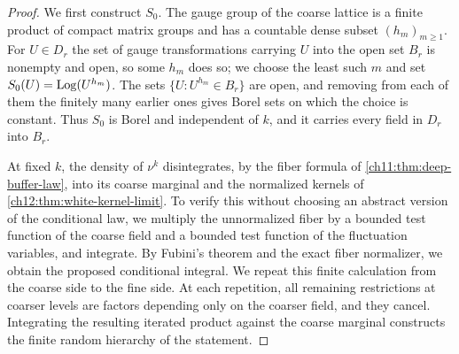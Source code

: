 \begin{proof}
We first construct $S_0$. The gauge group of the coarse lattice is a finite product of compact matrix groups and has a countable dense subset $(h_m)_{m\ge1}$. For $U\in D_r$ the set of gauge transformations carrying $U$ into the open set $B_r$ is nonempty and open, so some $h_m$ does so; we choose the least such $m$ and set $S_0(U)=\operatorname{Log}(U^{h_m})$. The sets $\{U:U^{h_m}\in B_r\}$ are open, and removing from each of them the finitely many earlier ones gives Borel sets on which the choice is constant. Thus $S_0$ is Borel and independent of $k$, and it carries every field in $D_r$ into $B_r$.

At fixed $k$, the density of $\nu^k$ disintegrates, by the fiber formula of \cref{ch11:thm:deep-buffer-law}, into its coarse marginal and the normalized kernels of \cref{ch12:thm:white-kernel-limit}. To verify this without choosing an abstract version of the conditional law, we multiply the unnormalized fiber by a bounded test function of the coarse field and a bounded test function of the fluctuation variables, and integrate. By Fubini's theorem and the exact fiber normalizer, we obtain the proposed conditional integral. We repeat this finite calculation from the coarse side to the fine side. At each repetition, all remaining restrictions at coarser levels are factors depending only on the coarser field, and they cancel. Integrating the resulting iterated product against the coarse marginal constructs the finite random hierarchy of the statement.


\end{proof}
